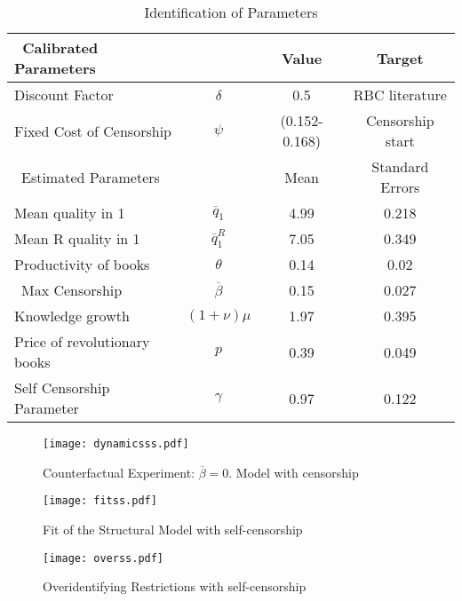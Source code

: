 \begin{table}[htpb]
\caption{Identification of Parameters}
\centering %
\begin{tabular}{@{} l c c c @{}}
	\hline%
	\ Calibrated Parameters &  & Value & Target  \\ [0.05ex] %
	\hline
	Discount Factor  & $\delta$   &0.5&   RBC literature\\[0.15ex]
	Fixed Cost of Censorship  & $\psi$   &(0.152-0.168)& Censorship start \\[0.15ex]
	\hline %
	\ Estimated Parameters &  & Mean & Standard Errors  \\ [0.05ex] %
	\hline %
	\rule{0pt}{2.5ex}
	Mean quality in 1  & $\overline{q}_1$   & 4.99 & 0.218  \\[0.15ex]
	Mean R quality in 1  & $\overline{q}^R_1$   & 7.05 & 0.349  \\[0.15ex]
	Productivity of books  & $\theta$   & 0.14 &  0.02  \\[0.15ex]
	\ Max Censorship  & $\overline{\beta}$   & 0.15 &  0.027   \\[0.15ex]
	Knowledge growth & $(1+\nu)\mu$   & 1.97 &  0.395   \\[0.15ex]
	Price of revolutionary books   & $p$   & 0.39 &  0.049  \\[0.15ex]
	Self Censorship Parameter   & $\gamma$   & 0.97 &  0.122  \\[0.15ex]
	\hline
\end{tabular}
\label{table:paramss}
\end{table}

\begin{figure}[htbp]
\texttt{[image: dynamicsss.pdf]}
\caption{Counterfactual Experiment: $\overline{\beta}=0$. Model with censorship}
\label{fig:exps}
\end{figure}

\begin{figure}[htpb]
\centering
\texttt{[image: fitss.pdf]}
\caption{Fit of the Structural Model with self-censorship}
\label{fig:fits}
\end{figure}


\begin{figure}[htbp]
\centering
\texttt{[image: overss.pdf]}
\caption{Overidentifying Restrictions with self-censorship}
\label{fig:overs}
\end{figure}

